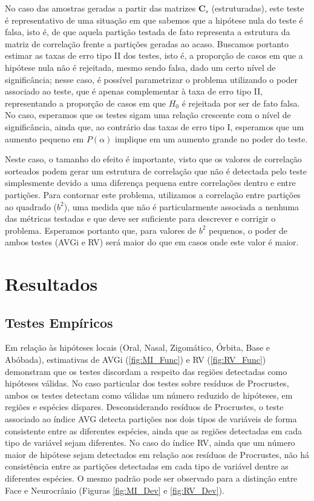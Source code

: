 \documentclass[11pt,]{article}
\begin{document}
No caso das amostras geradas a partir das matrizes $\mathbf{C}_s$
(estruturadas), este teste é representativo de uma situação em que
sabemos que a hipótese nula do teste é falsa, isto é, de que aquela
partição testada de fato representa a estrutura da matriz de correlação
frente a partições geradas ao acaso. Buscamos portanto estimar as taxas
de erro tipo II dos testes, isto é, a proporção de casos em que a
hipótese nula não é rejeitada, mesmo sendo falsa, dado um certo nível de
significância; nesse caso, é possível parametrizar o problema utilizando
o poder associado ao teste, que é apenas complementar à taxa de erro
tipo II, representando a proporção de casos em que $H_0$ é rejeitada por
ser de fato falsa. No caso, esperamos que os testes sigam uma relação
crescente com o nível de significância, ainda que, ao contrário das
taxas de erro tipo I, esperamos que um aumento pequeno em $P(\alpha)$
implique em um aumento grande no poder do teste.

Neste caso, o tamanho do efeito é importante, visto que os valores de
correlação sorteados podem gerar um estrutura de correlação que não é
detectada pelo teste simplesmente devido a uma diferença pequena entre
correlações dentro e entre partições. Para contornar este problema,
utilizamos a correlação entre partições ao quadrado ($b^2$), uma medida
que não é particularmente associada a nenhuma das métricas testadas e
que deve ser suficiente para descrever e corrigir o problema. Esperamos
portanto que, para valores de $b^2$ pequenos, o poder de ambos testes
(AVGi e RV) será maior do que em casos onde este valor é maior.

\section{Resultados}\label{resultados}

\subsection{Testes Empíricos}\label{testes-empiricos}

Em relação às hipóteses locais (Oral, Nasal, Zigomático, Órbita, Base e
Abóbada), estimativas de AVGi (\autoref{fig:MI_Func}) e RV
(\autoref{fig:RV_Func}) demonstram que os testes discordam a respeito
das regiões detectadas como hipóteses válidas. No caso particular dos
testes sobre resíduos de Procrustes, ambos os testes detectam como
válidas um número reduzido de hipóteses, em regiões e espécies díspares.
Desconsiderando resíduos de Procrustes, o teste associado ao índice AVG
detecta partições nos dois tipos de variáveis de forma consistente entre
as diferentes espécies, ainda que as regiões detectadas em cada tipo de
variável sejam diferentes. No caso do índice RV, ainda que um número
maior de hipótese sejam detectados em relação aos resíduos de
Procrustes, não há consistência entre as partições detectadas em cada
tipo de variável dentre as diferentes espécies. O mesmo padrão pode ser
observado para a distinção entre Face e Neurocrânio (Figuras
\ref{fig:MI_Dev} e \ref{fig:RV_Dev}).
\end{document}
